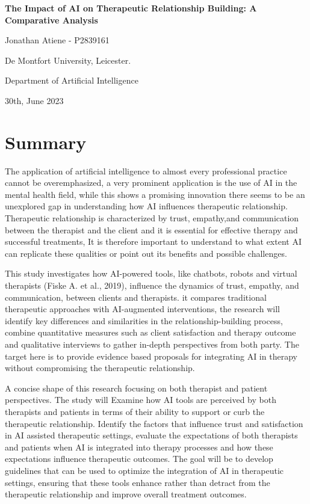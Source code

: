 \documentclass[12pt]{article}
\begin{document}
    \begin{titlepage}
        \centering
        \Huge
        \textbf{ The Impact of AI on Therapeutic Relationship Building: A Comparative Analysis}

        \vspace{0.5in}
        \Large
        Jonathan Atiene - P2839161

        \vspace{0.5in}
        \Huge
        De Montfort University, Leicester.

        \vspace{0.1in}
        \Large
        Department of Artificial Intelligence


        \vspace{0.1in}
        30th, June 2023

    \end{titlepage}

    \newpage
    \section{Summary}
    The application of artificial intelligence to almost every professional practice cannot be overemphasized,  a very prominent application is the use of AI in the mental health field, while this shows a promising innovation there seems to be an unexplored gap in understanding how AI influences therapeutic relationship. Therapeutic relationship is characterized by trust, empathy,and communication between the therapist and the client and it is essential for effective therapy and successful treatments, It is therefore important to understand to what extent AI can replicate these qualities or point out its benefits and possible challenges.

    This study investigates how AI-powered tools, like chatbots, robots and virtual therapists (Fiske A. et al., 2019), influence the dynamics of trust, empathy, and communication, between clients and therapists. it compares traditional therapeutic approaches with AI-augmented interventions, the research will identify key differences and similarities in the relationship-building process, combine quantitative measures such as client satisfaction and therapy outcome and qualitative interviews to gather in-depth perspectives from both party. The target here is to provide evidence based proposals for integrating AI in therapy without compromising the therapeutic relationship.

    A concise shape of this research focusing on both therapist and patient perspectives. The study will Examine how AI tools are perceived by both therapists and patients in terms of their ability to support or curb the therapeutic relationship. Identify the factors that influence trust and satisfaction in AI assisted therapeutic settings, evaluate the expectations of both therapists and patients when AI is integrated into therapy processes and how these expectations influence therapeutic outcomes. The goal will be to develop guidelines that can be used to optimize the integration of AI in therapeutic settings, ensuring that these tools enhance rather than detract from the therapeutic relationship and improve overall treatment outcomes.
\end{document}
